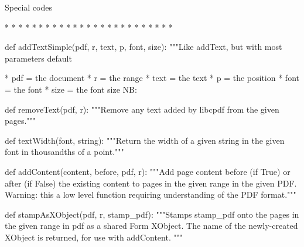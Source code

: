     Special codes

      * %
      * %
      * %
      * %
      * %
      * %
      * %
      * %
      * %
      * %
      * %
      * %
      * %
      * %
      * %
      * %
      * %
      * %
      * %
      * %
      * %
      * %
      * %
      * %
      * %

def addTextSimple(pdf, r, text, p, font, size):
    """Like addText, but with most parameters default

         * pdf = the document
         * r = the range
         * text = the text
         * p = the position
         * font = the font
         * size = the font size
    NB: %

def removeText(pdf, r):
    """Remove any text added by libcpdf from the given pages."""

def textWidth(font, string):
    """Return the width of a given string in the given font in thousandths of a
    point."""

def addContent(content, before, pdf, r):
    """Add page content before (if True) or after (if False) the existing
    content to pages in the given range in the given PDF. Warning: this a low
    level function requiring understanding of the PDF format."""

def stampAsXObject(pdf, r, stamp_pdf):
    """Stamps stamp_pdf onto the pages in the given range in pdf as a shared
    Form XObject. The name of the newly-created XObject is returned, for use
    with addContent. """
